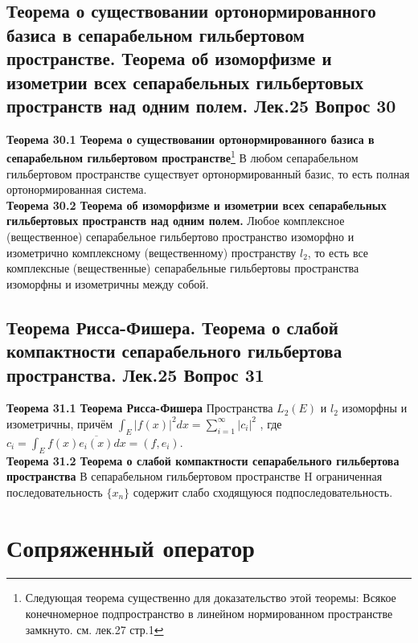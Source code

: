 \documentclass{article}
\begin{document}
\subsection{Теорема о существовании ортонормированного базиса в сепарабельном гильбертовом пространстве. Теорема об изоморфизме и изометрии всех сепарабельных гильбертовых пространств над одним полем. Лек.25 \textbf{Вопрос 30}}
	\textbf{Теорема 30.1 Теорема о существовании ортонормированного базиса в сепарабельном гильбертовом пространстве}\footnote{Следующая теорема существенно для доказательство этой теоремы: Всякое конечномерное подпространство в линейном нормированном пространстве замкнуто. см. лек.27 стр.1} В любом сепарабельном гильбертовом пространстве
	существует ортонормированный базис, то есть полная
	ортонормированная система.\\
	\textbf{Теорема 30.2 Теорема об изоморфизме и изометрии всех сепарабельных гильбертовых пространств над одним полем.} Любое комплексное (вещественное) сепарабельное гильбертово пространство изоморфно и изометрично комплексному (вещественному) пространству ${l}_{2}$, то есть все комплексные (вещественные) сепарабельные гильбертовы пространства изоморфны и изометричны между собой.\\
\subsection{Теорема Рисса-Фишера. Теорема о слабой компактности сепарабельного гильбертова пространства. Лек.25 \textbf{Вопрос 31}}
	\textbf{Теорема 31.1 Теорема Рисса-Фишера} Пространства ${L}_{2}(E)$ и ${l}_{2}$ изоморфны и изометричны, причём $\int_{E} {|f(x)|}^{2}dx=\sum_{i=1}^{\infty} {|{c}_{i}|}^{2}$ , где ${c}_{i}=\int_{E} f(x)\overline{{e}_{i}(x)}dx=(f,{e}_{i})$.\\
	\textbf{Теорема 31.2 Теорема о слабой компактности сепарабельного гильбертова пространства} В сепарабельном гильбертовом пространстве H
	ограниченная последовательность $\{{x}_{n}\}$ содержит слабо сходящуюся подпоследовательность.\\
\section{Сопряженный оператор}
\end{document}

